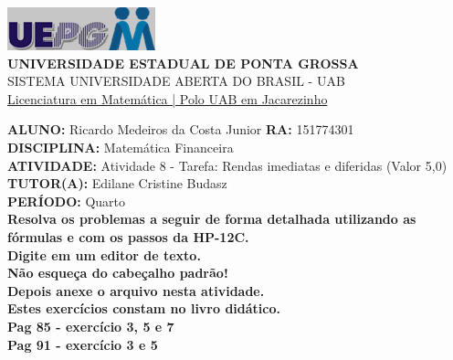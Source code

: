 \documentclass[a4paper, 12pt]{article}
\begin{document}
\begin{flushleft}\includegraphics{logo}\\
\textbf{UNIVERSIDADE ESTADUAL DE PONTA GROSSA} \\
SISTEMA UNIVERSIDADE ABERTA DO BRASIL - UAB \\
\underline{Licenciatura em Matemática | Polo UAB em Jacarezinho}\end{flushleft} 
\textbf{ALUNO:} Ricardo Medeiros da Costa Junior   \textbf{RA:} 151774301 \\
\textbf{DISCIPLINA:} Matemática Financeira \\
\textbf{ATIVIDADE:} Atividade 8 - Tarefa: Rendas imediatas e diferidas (Valor 5,0) \\
\textbf{TUTOR(A):} Edilane Cristine Budasz \\
\textbf{PERÍODO:} Quarto \\

\textbf{Resolva os problemas a seguir de forma detalhada utilizando as fórmulas e com os passos da HP-12C.}
\\
\textbf{Digite em um editor de texto.} \\
\textbf{Não esqueça do cabeçalho padrão!} \\
\textbf{Depois anexe o arquivo nesta atividade.} \\
\textbf{Estes exercícios constam no livro didático.} \\
\textbf{Pag 85 - exercício 3, 5 e 7}\\
\textbf{Pag 91 - exercício 3 e 5}\\
\end{document}
